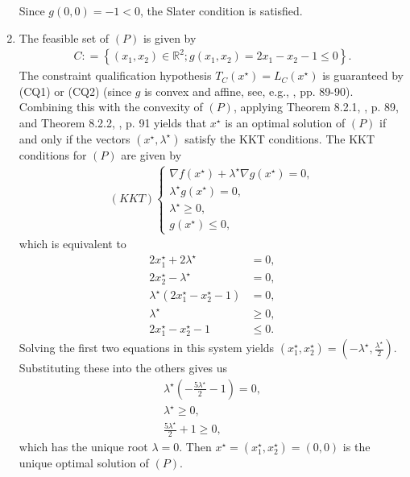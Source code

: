 \documentclass[a4paper]{article}
\numberwithin{equation}{section}
\begin{document}
\begin{enumerate}
Since $g\left(0,0\right)=-1<0$, the Slater condition is satisfied.
\item The feasible set of $\left(P\right)$ is given by
\begin{align}
C: = \left\{ {\left( {{x_1},{x_2}} \right) \in {\mathbb{R}^2};g\left( {{x_1},{x_2}} \right)=2x_1-x_2-1 \le 0} \right\} .
\end{align}
The constraint qualification hypothesis $T_C\left(x^\star\right) =L_C\left(x^\star\right)$ is guaranteed by (CQ1) or (CQ2) (since $g$ is convex and affine, see, e.g., \cite{2}, pp. 89-90). Combining this with the convexity of $\left(P\right)$, applying Theorem 8.2.1, \cite{2}, p. 89, and Theorem 8.2.2, \cite{2}, p. 91 yields that $x^\star$ is an optimal solution of $\left(P\right)$ if and only if the vectors $\left(x^\star,\lambda ^\star\right)$ satisfy the KKT conditions. The KKT conditions for $\left(P\right)$ are given by
\begin{align}
\label{1.62}
\left( {KKT} \right)\left\{ {\begin{array}{*{20}{l}}
{\nabla f\left( {{x^\star}} \right) + {\lambda ^\star}\nabla g\left( {{x^\star}} \right) = 0,}\\
{{\lambda ^\star}g\left( {{x^\star}} \right) = 0,}\\
{{\lambda ^\star} \ge 0,}\\
{g\left( {{x^\star}} \right) \le 0,}
\end{array}} \right. 
\end{align}
which is equivalent to
\begin{align}
2x_1^\star + 2{\lambda ^\star} &= 0,\\
2x_2^\star - {\lambda ^\star} &= 0,\\
{\lambda ^\star}\left( {2x_1^\star - x_2^\star - 1} \right) &= 0,\\
{\lambda ^\star} &\ge 0,\\
2x_1^\star - x_2^\star - 1 &\le 0.
\end{align}
Solving the first two equations in this system yields $\left( {x_1^\star,x_2^\star} \right) = \left( { - {\lambda ^\star},\frac{{{\lambda ^\star}}}{2}} \right)$. Substituting these into the others gives us
\begin{align}
{\lambda ^\star}\left( { - \frac{{5{\lambda ^\star}}}{2} - 1} \right) = 0,\\
{\lambda ^\star} \ge 0,\\
\frac{{5{\lambda ^\star}}}{2} + 1 \ge 0,
\end{align}
which has the unique root $\lambda =0$. Then $x^\star =\left(x_1^\star,x_2^\star\right) =\left(0,0\right)$ is the unique optimal solution of $\left(P\right)$.

\end{enumerate}
\end{document}
